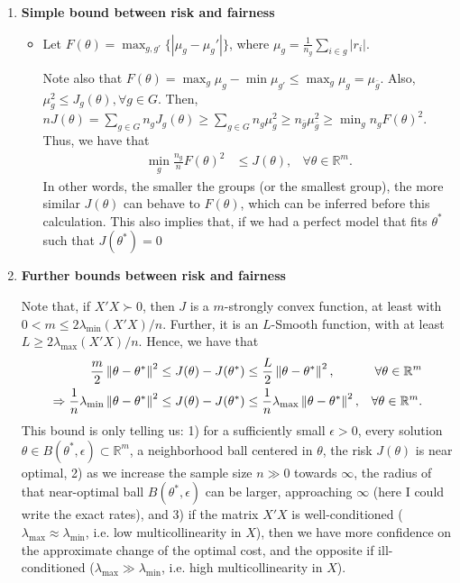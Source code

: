 \documentclass{article}
\newcommand{\R}{\mathbb{R}}
\begin{document}
\begin{enumerate}
    \item \textbf{Simple bound between risk and fairness}

       \begin{itemize}
        \item  Let $F(\theta)=\max_{g,g'}\{|\mu_g - \mu_g'|\}$, where $\mu_g = \frac{1}{n_g}\sum_{i\in g}|r_i|$.
        
        Note also that $F(\theta)=\max_g \mu_g - \min \mu_{g'}\leq \max_g \mu_g = \mu_{\bar{g}}$. Also, $\mu_g^2 \leq J_g(\theta), \forall g\in G$. Then, $nJ(\theta) = \sum_{g\in G}n_g J_g(\theta) \geq \sum_{g\in G}n_g \mu_g^2 \geq n_{\bar{g}} \mu_{\bar{g}}
        ^2 \geq \min_g{n_g} F(\theta)^2$. Thus, we have that
        \begin{align}
            \min_g\frac{n_g}{n}F(\theta)^2 &\leq J(\theta),& \forall \theta \in \R^m.
        \end{align}
        In other words, the smaller the groups (or the smallest group), the more similar $J(\theta)$ can behave to $F(\theta)$, which can be inferred before this calculation. This also implies that, if we had a perfect model that fits $\theta^*$ such that $J(\theta^*)=0$
    \end{itemize}

    \item \textbf{Further bounds between risk and fairness}
    
Note that, if $X'X \succ 0$, then $J$ is a $m$-strongly convex function, at least with $0<m\leq 2\lambda_{\min}(X'X)/n$. Further, it is an $L$-Smooth function, with at least $L\geq 2\lambda_{\max}(X'X)/n$. Hence, we have that 
        \begin{align}
         \nonumber
        \frac{m}{2} \norm[]{\theta - \theta^*}^2 &\leq J(\theta) - J(\theta^*) \leq \frac{L}{2}\norm[]{\theta - \theta^*}^2, & \forall \theta \in \R^m\\
        \label{eq:mse_bound}
        \Rightarrow \frac{1}{n}\lambda_{\min} \norm[]{\theta - \theta^*}^2 &\leq J(\theta) - J(\theta^*) \leq \frac{1}{n}\lambda_{\max}\norm[]{\theta - \theta^*}^2, & \forall \theta \in \R^m.
        \end{align}
        This bound is only telling us: 1) for a sufficiently small $\epsilon >0$, every solution $\theta \in B(\theta^*, \epsilon)\subset \R^m$, a neighborhood ball centered in $\theta$, the risk $J(\theta)$ is near optimal, 2) as we increase the sample size $n \gg 0$ towards $\infty$, the radius of that near-optimal ball $B(\theta^*, \epsilon)$ can be larger, approaching $\infty$ {\color{red} (here I could write the exact rates)}, and 3) if the matrix $X'X$ is well-conditioned ($\lambda_{\max} \approx  \lambda_{\min}$, i.e. low multicollinearity in $X$), then we have more confidence on the approximate change of the optimal cost, and the opposite if ill-conditioned ($\lambda_{\max} \gg  \lambda_{\min}$, i.e. high multicollinearity in $X$). 


\end{enumerate}
\end{document}
